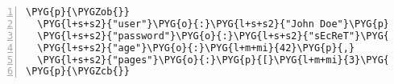 \begin{Verbatim}[commandchars=\\\{\},numbers=left,stepnumber=1,codes={\catcode`\$=3\catcode`\^=7\catcode`\_=8}]
\PYG{p}{\PYGZob{}}
  \PYG{l+s+s2}{"user"}\PYG{o}{:}\PYG{l+s+s2}{"John Doe"}\PYG{p}{,}
  \PYG{l+s+s2}{"password"}\PYG{o}{:}\PYG{l+s+s2}{"sEcReT"}\PYG{p}{,}
  \PYG{l+s+s2}{"age"}\PYG{o}{:}\PYG{l+m+mi}{42}\PYG{p}{,}
  \PYG{l+s+s2}{"pages"}\PYG{o}{:}\PYG{p}{[}\PYG{l+m+mi}{3}\PYG{p}{,}\PYG{l+m+mi}{1}\PYG{p}{,}\PYG{l+m+mi}{4}\PYG{p}{]}\PYG{p}{,}
\PYG{p}{\PYGZcb{}}
\end{Verbatim}
